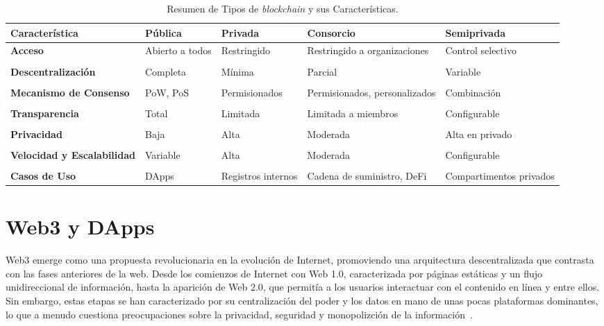 \begin{table}
\small
\begin{centering}
		\begin{tabular}{@{}p{3.3cm} p{2cm} p{2.5cm} p{2.5cm} p{2.5cm}@{}}
		\toprule
		\textbf{Característica} & \textbf{Pública} & \textbf{Privada} & \textbf{Consorcio} & \textbf{Semiprivada} \\ 
		\midrule
		\textbf{Acceso} & Abierto a todos & Restringido & Restringido a organizaciones & Control selectivo \\\\
		\textbf{Descentralización} & Completa & Mínima & Parcial & Variable \\\\
		\textbf{Mecanismo de Consenso} & PoW, PoS & Permisionados & Permisionados, personalizados & Combinación \\\\
		\textbf{Transparencia} & Total & Limitada & Limitada a miembros & Configurable \\\\
		\textbf{Privacidad} & Baja & Alta & Moderada & Alta en privado \\\\
		\textbf{Velocidad y Escalabilidad} & Variable & Alta & Moderada & Configurable \\\\
		\textbf{Casos de Uso} & DApps & Registros internos & Cadena de suministro, DeFi & Compartimentos privados \\
		\bottomrule
		\end{tabular}
\end{centering}
\caption{Resumen de Tipos de \textit{blockchain} y sus Características.}
\label{tabla_blockchain_caracteristicas}	
\end{table}



\section{Web3 y DApps}

Web3 emerge como una propuesta revolucionaria en la evolución de Internet, promoviendo una arquitectura descentralizada que contrasta con las fases anteriores de la web.
Desde los comienzos de Internet con Web 1.0, caracterizada por páginas estáticas y un flujo unidireccional de información, hasta la aparición de Web 2.0, que permitía a los usuarios interactuar con el contenido en línea y entre ellos. 
Sin embargo, estas etapas se han caracterizado por su centralización del poder y los datos en mano de unas pocas plataformas dominantes, lo que a menudo cuestiona preocupaciones sobre la privacidad, seguridad y monopolizción de la información~\cite{Web3}. 

